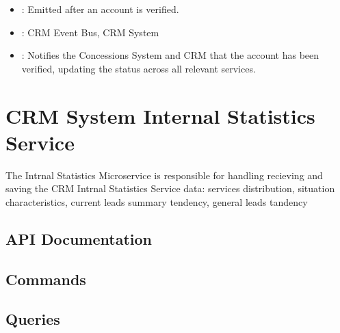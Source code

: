 \documentclass[letterpaper,10pt,english]{sphinxmanual}
\begin{document}
\sphinxAtStartPar
{}
\begin{itemize}
\item {} 
\sphinxAtStartPar
{}: Emitted after an account is verified.

\item {} 
\sphinxAtStartPar
{}: CRM Event Bus, CRM System

\item {} 
\sphinxAtStartPar
{}: Notifies the Concessions System and CRM that the account has been verified, updating the status across all relevant services.

\end{itemize}

\sphinxstepscope


\section{CRM System Internal Statistics Service}
\label{\detokenize{crm_system/internal_satistics_service:crm-system-internal-statistics-service}}\label{\detokenize{crm_system/internal_satistics_service::doc}}
\sphinxAtStartPar
The Intrnal Statistics Microservice is responsible for handling recieving and saving  the CRM Intrnal Statistics Service data: services distribution, situation characteristics, current leads summary tendency, general leads tandency



\subsection{API Documentation}
\label{\detokenize{crm_system/internal_satistics_service:api-documentation}}

\subsection{Commands}
\label{\detokenize{crm_system/internal_satistics_service:commands}}

\subsection{Queries}
\label{\detokenize{crm_system/internal_satistics_service:queries}}
\end{document}
